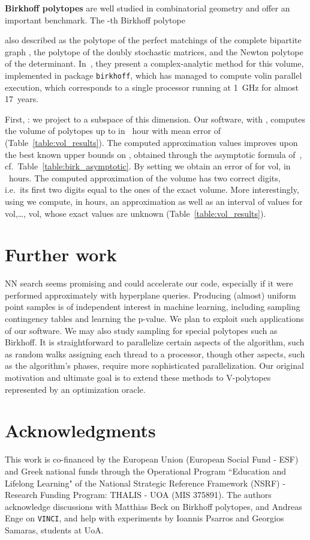 \documentclass[11pt,a4paper]{article}
\def\vol{\mbox{vol}}
\def\vol{\mbox{vol}}
\begin{document}
\vspace{.5em}
\textbf{Birkhoff polytopes}
are well studied in combinatorial geometry and offer an important benchmark.
The -th Birkhoff polytope 
 
also described as the polytope of the 
perfect matchings of the complete bipartite graph , 
the polytope of the  doubly stochastic matrices, 
and the Newton polytope of the determinant.
In~\cite{BeckPixton03}, they present a complex-analytic method for 
this volume, implemented in package {\tt birkhoff}, which has managed
to compute \vol in parallel execution, 
which corresponds to a single processor running at 1~GHz for almost 17~years.

First, : we project  to
a subspace of this dimension.
Our software, with ,  computes the volume of polytopes up to 
in ~hour with mean error of  (Table~\ref{table:vol_results}).
The computed approximation values improves upon the best known upper bounds on , obtained through the asymptotic formula of~\cite{GMcKay09}, cf.\ Table~\ref{table:birk_asymptotic}.
By setting  we obtain an error of  for \vol,
in ~hours. The computed approximation of the volume has two correct digits, i.e.\ its first two digits equal to the ones of the exact volume.
More interestingly, using  we compute, in  hours, an approximation as well as an interval of values for \vol,\dots, \vol,
whose exact values are unknown (Table~\ref{table:vol_results}).

\section{Further work}\label{sec:further}

NN search seems promising and could accelerate our
code, especially if it were performed approximately with
hyperplane queries.
Producing (almost) uniform point samples
is of independent interest in machine learning, including
sampling contingency tables and learning the p-value. We plan
to exploit such applications of our software. 
We may also study sampling for special polytopes such as Birkhoff.
It is straightforward to parallelize certain aspects of the algorithm, 
such as random walks assigning each thread to a processor,
though other aspects, such as the algorithm's phases,
require more sophisticated parallelization.
Our original motivation and ultimate goal is to extend these methods to
V-polytopes represented by an optimization oracle.

\section{Acknowledgments}
This work is  
co-financed by the European Union (European Social Fund - ESF) and Greek national funds through the Operational Program ``Education and Lifelong Learning" of the National Strategic Reference Framework (NSRF) - Research Funding Program: THALIS - UOA (MIS 375891).
The authors acknowledge discussions with Matthias Beck on Birkhoff polytopes,
and Andreas Enge on {\tt VINCI}, and help with experiments
by Ioannis Psarros and Georgios Samaras, students at UoA.

  
\end{document}
